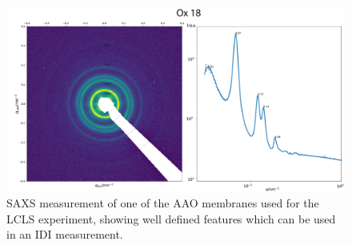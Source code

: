 \begin{figure}[h!]
	\centering
	\includegraphics[width=0.8\linewidth]{images/ox18.pdf}
	\caption[SAXS of AAO membrane sample]{SAXS measurement of one of the AAO membranes used for the LCLS experiment, showing well defined features which can be used in an IDI measurement.}
	\label{fig:saxsaao}
\end{figure}



